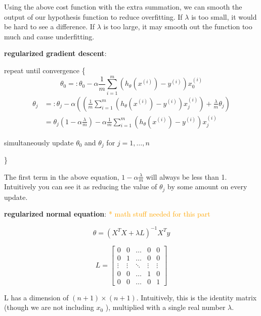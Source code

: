 \documentclass{article}
\begin{document}
\noindent Using the above cost function with the extra summation, we can smooth the output of our hypothesis function to reduce overfitting. If \(\lambda\) is too small, it would be hard to see a difference. If \(\lambda\) is too large, it may smooth out the function too much and cause underfitting.

\bigskip

\noindent \textbf{regularized gradient descent}:

\noindent repeat until convergence \{
\[\theta_0 =: \theta_0 - \alpha \frac{1}{m} \sum_{i = 1}^m (h_{\theta}(x^{(i)}) - y^{(i)}) x^{(i)}_0\]
\begin{equation*}
\begin{split}
\theta_j & =: \theta_j - \alpha ((\frac{1}{m} \sum_{i = 1}^m (h_{\theta}(x^{(i)}) - y^{(i)}) x^{(i)}_j) + \frac{\lambda}{m} \theta_j) \\
 & = \theta_j (1 - \alpha \frac{\lambda}{m}) - \alpha \frac{1}{m} \sum_{i = 1}^m (h_{\theta}(x^{(i)}) - y^{(i)}) x^{(i)}_j
\end{split}
\end{equation*}

\centerline{simultaneously update \(\theta_0\) and \(\theta_j\) for \(j = 1, \dots, n\)}
\}

\bigskip

\noindent The first term in the above equation, \(1 - \alpha \frac{\lambda}{m}\) will always be less than 1. Intuitively you can see it as reducing the value of \(\theta_j\) by some amount on every update.

\bigskip

\noindent \textbf{regularized normal equation}: \textcolor{orange}{ * math stuff needed for this part}

\[
\theta = (X^TX + \lambda L)^{-1}X^Ty
\]

\[
L = 
\begin{bmatrix}
0 & 0 & \dots & 0 & 0\\
0 & 1 & \dots & 0 & 0\\
\vdots & \vdots & \ddots & \vdots & \vdots\\
0 & 0 & \dots & 1 & 0\\
0 & 0 & \dots & 0 & 1
\end{bmatrix}
\]

\bigskip

\noindent L has a dimension of \((n + 1) \times (n + 1)\). Intuitively, this is the identity matrix (though we are not including \(x_0\) ), multiplied with a single real number \(\lambda\).
\end{document}
